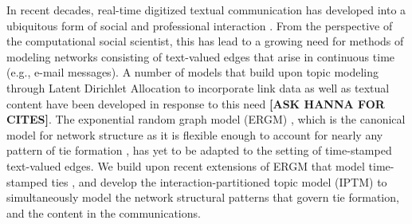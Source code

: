 \documentclass[a4paper]{article}
\begin{document}
In recent decades, real-time digitized textual communication has developed into a ubiquitous form of social and professional interaction \citep[see, e.g.,][]{kanungo2008modeling, szostek2011dealing, burgess2004email, pew2016}. From the perspective of the computational social scientist, this has lead to a growing need for methods of modeling networks consisting of text-valued edges that arise in continuous time (e.g., e-mail messages). A number of models that build upon topic modeling through Latent Dirichlet Allocation \citep{Blei2003} to incorporate link data as well as textual content have been developed in response to this need {\bf [ASK HANNA FOR CITES]}.  The exponential random graph model (ERGM) \citep{robins2007introduction,chatterjee2013estimating,hunter2008ergm}, which is the canonical model for network structure as it is flexible enough to account for nearly any pattern of tie formation \citep{desmarais2017statistical}, has yet to be adapted to the setting of time-stamped text-valued edges. We build upon recent extensions of ERGM that model time-stamped ties \citep{PerryWolfe2012,Butts2008}, and develop the interaction-partitioned topic model (IPTM) to simultaneously model the network structural patterns that govern tie formation, and the content in the communications.

\newpage
\end{document}
